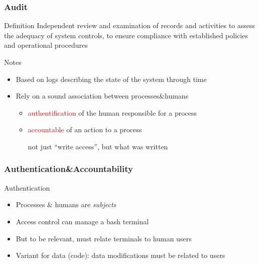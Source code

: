 \begin{reveals}
\begin{frame}
\end{frame}

\begin{frame}
  \frametitle{Audit}

  \vfill

  \begin{block}{Definition}
    Independent review and examination of records and activities to
    assess the adequacy of system controls, to ensure compliance with
    established policies and operational procedures
  \end{block}

  \vfill

  \begin{block}{Notes}
    \begin{itemize}
    \item Based on logs describing the state of the system through time
    \item Rely on a sound association between processes\&humans
      \begin{itemize}
      \item \textcolor{red}{authentification} of the human responsible
        for a process
      \item \textcolor{red}{accountable} of an action to a process
        \begin{center}
          not just ``write access'', but what was written
        \end{center}
      \end{itemize}
    \end{itemize}
  \end{block}


  \vfill
\end{frame}

\begin{frame}
  \frametitle{Authentication\&Accountability}

  \vfill

  \begin{block}{Authentication}
    \begin{itemize}
    \item Processes \& humans are \emph{subjects}
    \item Access control can manage a bash terminal
    \item But to be relevant, must relate terminals to human users 
    \item Variant for data (code): data modifications must be related to users
    \end{itemize}
  \end{block}


\end{frame}
\end{reveals}
